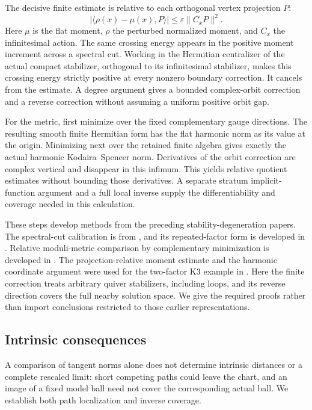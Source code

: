 The decisive finite estimate is relative to each orthogonal
vertex projection $P$:
\[
 |\langle\rho(x)-\mu(x),P\rangle|
       \le\varepsilon\|C_xP\|^2.
\]
Here $\mu$ is the flat moment, $\rho$ the perturbed normalized
moment, and $C_x$ the infinitesimal action. The same crossing
energy appears in the positive moment increment across a spectral
cut. Working in the Hermitian centralizer of the actual compact
stabilizer, orthogonal to its infinitesimal stabilizer, makes this
crossing energy strictly positive at every nonzero boundary
correction. It cancels from the estimate. A degree argument gives
a bounded complex-orbit correction and a reverse correction
without assuming a uniform positive orbit gap.

For the metric, first minimize over the fixed complementary
gauge directions. The resulting smooth finite Hermitian form
has the flat harmonic norm as its value at the origin. Minimizing
next over the retained finite algebra gives exactly the actual
harmonic Kodaira--Spencer norm. Derivatives of the orbit correction
are complex vertical and disappear in this infimum. This yields
relative quotient estimates without bounding those derivatives.
A separate stratum implicit-function argument and a full local
inverse supply the differentiability and coverage needed in this
calculation.

These steps develop methods from the preceding stability-degeneration
papers. The spectral-cut calibration is from
\cite{Wue26a}, and its repeated-factor form is developed in
\cite{Wue26c}. Relative moduli-metric comparison by complementary
minimization is developed in \cite{Wue26b,Wue26c}.
The projection-relative moment estimate and the harmonic
coordinate argument were used for the two-factor K3 example in
\cite{Wue26d}. Here the finite correction treats arbitrary
quiver stabilizers, including loops, and its reverse direction
covers the full nearby solution space. We give the required
proofs rather than import conclusions restricted to those earlier
representations.

\subsection{Intrinsic consequences}
A comparison of tangent norms alone does not determine intrinsic
distances or a complete rescaled limit: short competing paths
could leave the chart, and an image of a fixed model ball need
not cover the corresponding actual ball. We establish both
path localization and inverse coverage.


